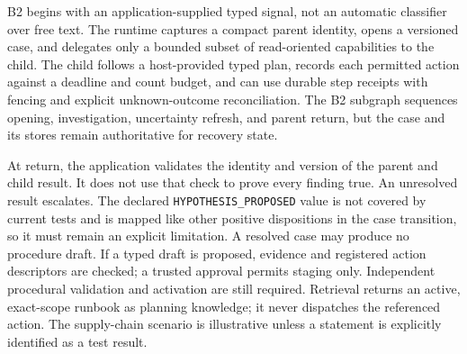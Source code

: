 \begin{chapterrecap}
B2 begins with an application-supplied typed signal, not an automatic classifier over free text. The runtime captures a compact parent identity, opens a versioned case, and delegates only a bounded subset of read-oriented capabilities to the child. The child follows a host-provided typed plan, records each permitted action against a deadline and count budget, and can use durable step receipts with fencing and explicit unknown-outcome reconciliation. The B2 subgraph sequences opening, investigation, uncertainty refresh, and parent return, but the case and its stores remain authoritative for recovery state.

At return, the application validates the identity and version of the parent and child result. It does not use that check to prove every finding true. An unresolved result escalates. The declared \texttt{HYPOTHESIS\_\allowbreak PROPOSED} value is not covered by current tests and is mapped like other positive dispositions in the case transition, so it must remain an explicit limitation. A resolved case may produce no procedure draft. If a typed draft is proposed, evidence and registered action descriptors are checked; a trusted approval permits staging only. Independent procedural validation and activation are still required. Retrieval returns an active, exact-scope runbook as planning knowledge; it never dispatches the referenced action. The supply-chain scenario is illustrative unless a statement is explicitly identified as a test result.
\end{chapterrecap}

